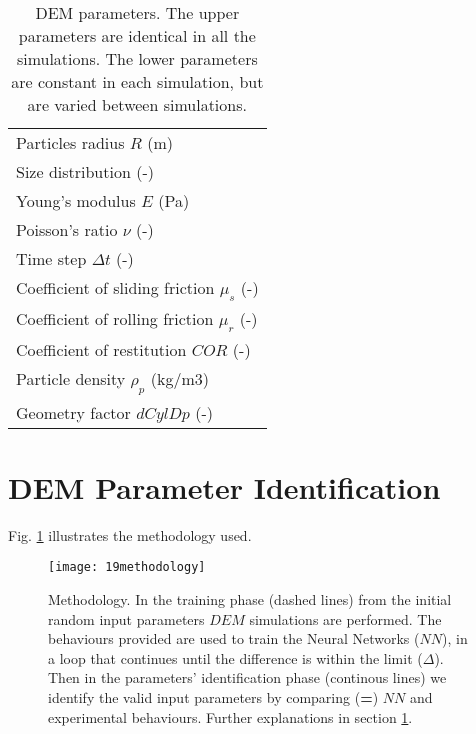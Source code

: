 \documentclass[review]{elsarticle}
\begin{document}
%
\begin{table}[h]
\centering
\begin{tabular}{l}
\hline 
     Particles radius $R$ (m)   \\ [5pt]

	Size distribution (-) \\ [5pt]

    Young's modulus $E$ (Pa)  \\ [5pt]

    Poisson's ratio $\nu$ (-) \\ 
     Time step $\Delta t$ (-) \\ [5pt]
        \hline
     Coefficient of sliding friction $\mu_s$ (-)\\  [5pt]
    Coefficient of rolling friction $\mu_r$ (-) \\ [5pt]
    Coefficient of restitution $COR$ (-)   \\ [5pt]
     Particle density $\rho_p$ (kg/m3)  \\ [5pt]
    Geometry factor $dCylDp$ (-)  \\ [5pt]
   
\hline
\end{tabular}
\caption[DEM parameters]{DEM parameters. The upper parameters are
identical in all the simulations. The lower parameters are constant in each
simulation, but are varied between simulations.}
\label{tab:08DEMparameters}
\end{table}

\section{DEM Parameter Identification}
\label{sec:methodology}

Fig. \ref{fig:19methodology} illustrates the methodology used.

\begin{figure}[!htb] 
\centering 
\texttt{[image: 19methodology]} 
\caption[Methodology]{Methodology. 
In the training phase (dashed lines) from the initial random input parameters
$DEM$ simulations are performed. The behaviours provided are used to train the
Neural Networks ($NN$), in a loop that continues until the difference is within
the limit ($\Delta$).
Then in the parameters' identification phase (continous
lines) we identify the valid input parameters by comparing (\textbf{=}) $NN$ and
experimental behaviours.
Further explanations in section \ref{sec:methodology}.
}
\label{fig:19methodology} 
\end{figure}
\end{document}
